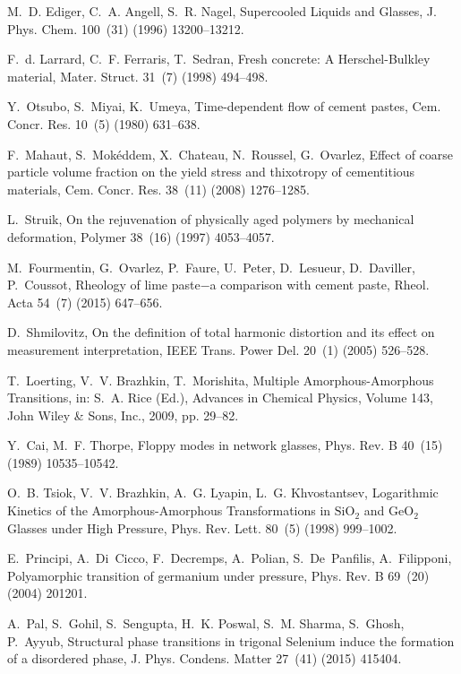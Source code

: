 \documentclass[final,5p,twocolumn]{elsarticle}
\begin{document}
M.~D. Ediger, C.~A. Angell, S.~R. Nagel, Supercooled {Liquids} and {Glasses},
  J. Phys. Chem. 100~(31) (1996) 13200--13212.

F.~d. Larrard, C.~F. Ferraris, T.~Sedran, Fresh concrete: {A}
  {Herschel}-{Bulkley} material, Mater. Struct. 31~(7) (1998) 494--498.

Y.~Otsubo, S.~Miyai, K.~Umeya, Time-dependent flow of cement pastes, Cem.
  Concr. Res. 10~(5) (1980) 631--638.

F.~Mahaut, S.~Mok{\'{e}}ddem, X.~Chateau, N.~Roussel, G.~Ovarlez, Effect of
  coarse particle volume fraction on the yield stress and thixotropy of
  cementitious materials, Cem. Concr. Res. 38~(11) (2008) 1276--1285.

L.~Struik, On the rejuvenation of physically aged polymers by mechanical
  deformation, Polymer 38~(16) (1997) 4053--4057.

M.~Fourmentin, G.~Ovarlez, P.~Faure, U.~Peter, D.~Lesueur, D.~Daviller,
  P.~Coussot, Rheology of lime paste$-$a comparison with cement paste, Rheol.
  Acta 54~(7) (2015) 647--656.

D.~Shmilovitz, On the definition of total harmonic distortion and its effect on
measurement interpretation, IEEE Trans. Power Del. 20~(1) (2005) 526--528.

T.~Loerting, V.~V. Brazhkin, T.~Morishita, Multiple {Amorphous}-{Amorphous}
  {Transitions}, in: S.~A. Rice (Ed.), Advances in {Chemical} {Physics},
  {Volume} 143, John Wiley \& Sons, Inc., 2009, pp. 29--82.

Y.~Cai, M.~F. Thorpe, Floppy modes in network glasses, Phys. Rev. B 40~(15)
  (1989) 10535--10542.

O.~B. Tsiok, V.~V. Brazhkin, A.~G. Lyapin, L.~G. Khvostantsev, Logarithmic
  {Kinetics} of the {Amorphous}-{Amorphous} {Transformations} in
  $\mathrm{SiO_2}$ and $\mathrm{GeO_2}$ {Glasses} under {High} {Pressure},
  Phys. Rev. Lett. 80~(5) (1998) 999--1002.

E.~Principi, A.~Di~Cicco, F.~Decremps, A.~Polian, S.~De~Panfilis, A.~Filipponi,
  Polyamorphic transition of germanium under pressure, Phys. Rev. B 69~(20)
  (2004) 201201.

A.~Pal, S.~Gohil, S.~Sengupta, H.~K. Poswal, S.~M. Sharma, S.~Ghosh, P.~Ayyub,
  Structural phase transitions in trigonal {Selenium} induce the formation of a
  disordered phase, J. Phys. Condens. Matter 27~(41) (2015) 415404.
\end{document}
